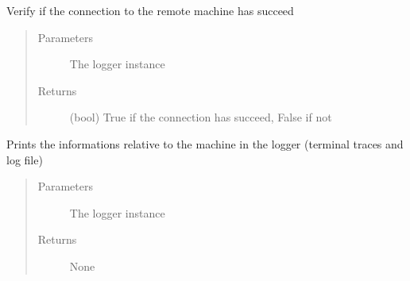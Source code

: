 \documentclass[a4paper,10pt,english]{sphinxmanual}
\begin{document}
\begin{fulllineitems}

\begin{fulllineitems}
\label{\detokenize{apidoc_commands/commands:commands.jobs.Machine.successfully_connected}}
Verify if the connection to the remote machine has succeed
\begin{quote}\begin{description}
\item[{Parameters}] \leavevmode
{} \textendash{} The logger instance

\item[{Returns}] \leavevmode
(bool) True if the connection has succeed, False if not

\end{description}\end{quote}

\end{fulllineitems}


\begin{fulllineitems}
\label{\detokenize{apidoc_commands/commands:commands.jobs.Machine.write_info}}
Prints the informations relative to the machine in the logger 
(terminal traces and log file)
\begin{quote}\begin{description}
\item[{Parameters}] \leavevmode
{} \textendash{} The logger instance

\item[{Returns}] \leavevmode
None

\end{description}\end{quote}

\end{fulllineitems}


\end{fulllineitems}

\end{document}
